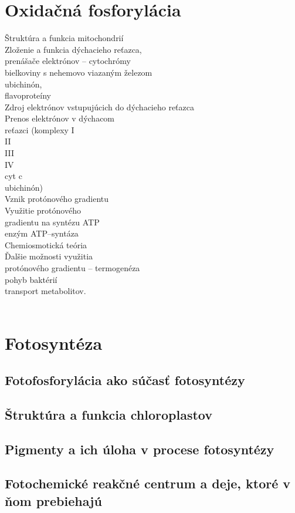 \section{Oxidačná fosforylácia}
Štruktúra a funkcia mitochondrií\\
Zloženie a funkcia dýchacieho reťazca,\\
prenášače elektrónov -- cytochrómy\\
\tab bielkoviny s nehemovo viazaným železom\\
\tab ubichinón,\\
flavoproteíny\\
Zdroj elektrónov vstupujúcich do dýchacieho reťazca\\
Prenos elektrónov v dýchacom\\
reťazci (komplexy I\\
\tab II\\
\tab III\\
\tab IV\\
\tab cyt c\\
\tab ubichinón)\\
Vznik protónového gradientu\\
Využitie protónového\\
gradientu na syntézu ATP\\
\tab enzým ATP--syntáza\\
Chemiosmotická teória\\
Ďalšie možnosti využitia\\
protónového gradientu -- termogenéza\\
\tab pohyb baktérií\\
\tab transport metabolitov.\\
\\
\section{Fotosyntéza}
\subsection{Fotofosforylácia ako súčasť fotosyntézy}
\subsection{Štruktúra a funkcia chloroplastov}
\subsection{Pigmenty a ich úloha v procese fotosyntézy}
\subsection{Fotochemické reakčné centrum a deje, ktoré v ňom prebiehajú}
